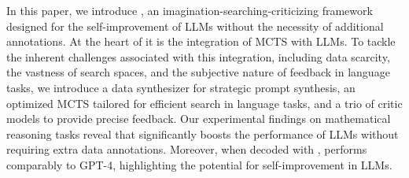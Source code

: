 In this paper, we introduce \model{}, an imagination-searching-criticizing framework designed for the self-improvement of LLMs without the necessity of additional annotations. At the heart of it is the integration of MCTS with LLMs. To tackle the inherent challenges associated with this integration, including data scarcity, the vastness of search spaces, and the subjective nature of feedback in language tasks, we introduce a data synthesizer for strategic prompt synthesis, an optimized MCTS tailored for efficient search in language tasks, and a trio of critic models to provide precise feedback. Our experimental findings on mathematical reasoning tasks reveal that \model{} significantly boosts the performance of LLMs without requiring extra data annotations. Moreover, when decoded with \emcts{}, \model{} performs comparably to GPT-4, highlighting the potential for self-improvement in LLMs.